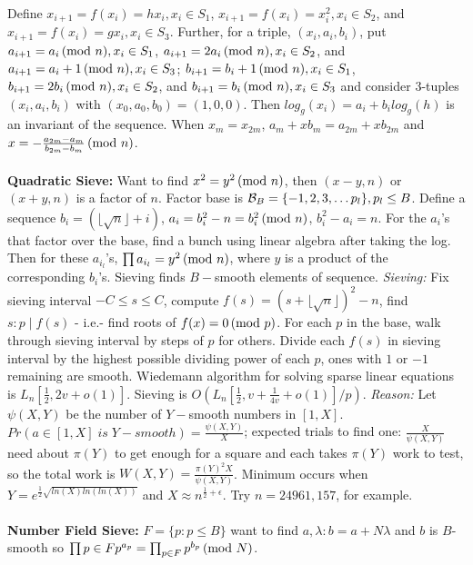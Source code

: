 Define 
$x_{i+1}= f(x_i)= h x_i, x_i \in S_1$,
$x_{i+1}= f(x_i)= x_i^2, x_i \in S_2$, and
$x_{i+1}= f(x_i)= g x_i, x_i \in S_3$.  Further, for a triple,
$(x_i , a_i, b_i)$, put
$a_{i+1}=  a_i \thinspace \textnormal{(mod } n \textnormal{)}, x_i \in S_1$,
$a_{i+1}= 2 a_i \thinspace \textnormal{(mod } n \textnormal{)}, x_i \in S_2$, and
$a_{i+1}=  a_i +1 \thinspace \textnormal{(mod } n \textnormal{)}, x_i \in S_3$;
$b_{i+1}=  b_i +1\thinspace \textnormal{(mod } n \textnormal{)}, x_i \in S_1$,
$b_{i+1}= 2 b_i \thinspace \textnormal{(mod } n \textnormal{)}, x_i \in S_2$, and
$b_{i+1}=  b_i \thinspace \textnormal{(mod } n \textnormal{)}, x_i \in S_3$ and consider $3$-tuples $(x_i , a_i , b_i)$ with
$(x_0, a_0, b_0) = (1,0,0)$.  Then $log_g(x_i)= a_i + b_i log_g(h)$ 
is an invariant of the sequence.  When 
$x_m= x_{2m}$, $a_m + x b_m= a_{2m} + x b_{2m}$ and 
$x= -{\frac {a_{2m}-a_m} {b_{2m}-b_m}} \thinspace \textnormal{(mod } n \textnormal{)}$.
\\
\\
{\bf Quadratic Sieve:} Want to find $x^2=y^2 \thinspace \textnormal{(mod } n \textnormal{)}$, then $(x-y,n)$ or
$(x+y,n)$ is a factor of $n$.  Factor base is 
${\cal B}_B= \{ -1, 2, 3, \ldots p_l \} , p_l \le B$.
Define a sequence $b_i= (\lfloor {\sqrt {n} \rfloor +i})$, 
$a_i = b_i^2 - n= b_i^2 \thinspace \textnormal{(mod } n \textnormal{)}$, $b_i^2 - {a_i}  = n$. 
For the $a_i$'s that factor over the base, find a bunch 
using linear algebra after taking the log.  Then for these $a_{i_l}$'s,
$\prod a_{i_l} = y^2 \thinspace \textnormal{(mod } n \textnormal{)}$, where $y$ is a product of the
corresponding $b_i$'s.  Sieving finds $B-$smooth elements of sequence.
\emph{Sieving:}  Fix sieving interval $-C \le s \le C$, compute 
$f(s)= (s+ \lfloor {\sqrt n \rfloor})^2-n$, find $s: p \mid f(s)$ - i.e.-
find roots of $f(x)=0 \thinspace \textnormal{(mod } p \textnormal{)}$.  For each $p$ in the base, walk through
sieving interval by steps of $p$ for others.  Divide each $f(s)$ in sieving
interval by the highest possible dividing power of each $p$, ones with $1$ or $-1$ 
remaining are smooth.
Wiedemann algorithm for solving sparse linear
equations is $L_n[{\frac 1 2}, 2v+o(1)]$.  
Sieving is $O(L_n[{\frac 1 2}, v+{\frac 1 {4v}}+o(1)]/p)$.  
\emph{Reason:}  Let $\psi(X,Y)$ be
the number of $Y-$smooth numbers in $[1,X]$.  $Pr(a \in [1,X] \; is \; Y-smooth)=
{\frac {\psi(X,Y)} X}$; expected trials to find one: ${\frac X {\psi(X,Y)}}$ need about
$\pi(Y)$ to get enough for a square and each takes $\pi(Y)$ work to test, so the total work
is $W(X,Y)= {\frac {\pi(Y)^2 X} {{\psi(X,Y)}}}$.  Minimum occurs when $Y=e^{{\frac 1 2}
{\sqrt {ln(X) ln(ln(X))}}}$ and $X \approx n^{{\frac 1 2} + \epsilon}$.
Try $n= 24961, 157$, for example.
\\
\\
{\bf Number Field Sieve:} $F= \{ p: p \le B \}$ want to find $a, \lambda: b= a+ N \lambda$ and
$b$ is $B$-smooth so $\prod{p \in F} p^{a_p} = \prod_{p \in F} p^{b_p} \thinspace \textnormal{(mod } N \textnormal{)}$.  
